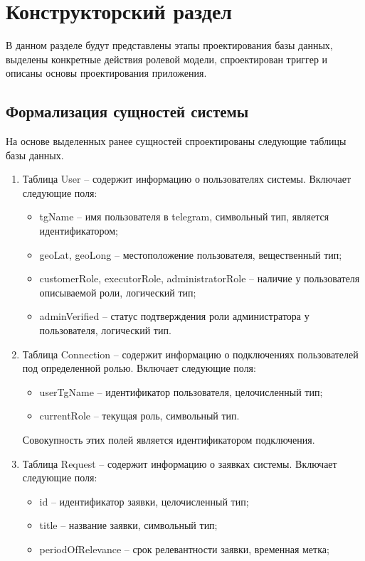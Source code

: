 \chapter{Конструкторский раздел}

В данном разделе будут представлены этапы проектирования базы данных, выделены конкретные действия ролевой модели, спроектирован триггер и описаны основы проектирования приложения.

\section{Формализация сущностей системы}

На основе выделенных ранее сущностей спроектированы следующие таблицы базы данных.
\begin{enumerate}
	\item Таблица User -- содержит информацию о пользователях системы. Включает следующие поля:
	\begin{itemize}
		\item tgName -- имя пользователя в telegram, символьный тип, является идентификатором;
		\item geoLat, geoLong -- местоположение пользователя, вещественный тип;
		\item customerRole, executorRole, administratorRole -- наличие у пользователя описываемой роли, логический тип;
		\item adminVerified -- статус подтверждения роли администратора у пользователя, логический тип.
	\end{itemize}
	\item Таблица Connection -- содержит информацию о подключениях пользователей под определенной ролью. Включает следующие поля:
	\begin{itemize}
		\item userTgName -- идентификатор пользователя, целочисленный тип;
		\item currentRole -- текущая роль, символьный тип.
	\end{itemize}
	Совокупность этих полей является идентификатором подключения.
	\item Таблица Request -- содержит информацию о заявках системы. Включает следующие поля:
	\begin{itemize}
		\item id -- идентификатор заявки, целочисленный тип;
		\item title -- название заявки, символьный тип; 
		\item periodOfRelevance -- срок релевантности заявки, временная метка;

\end{itemize}
\end{enumerate}

